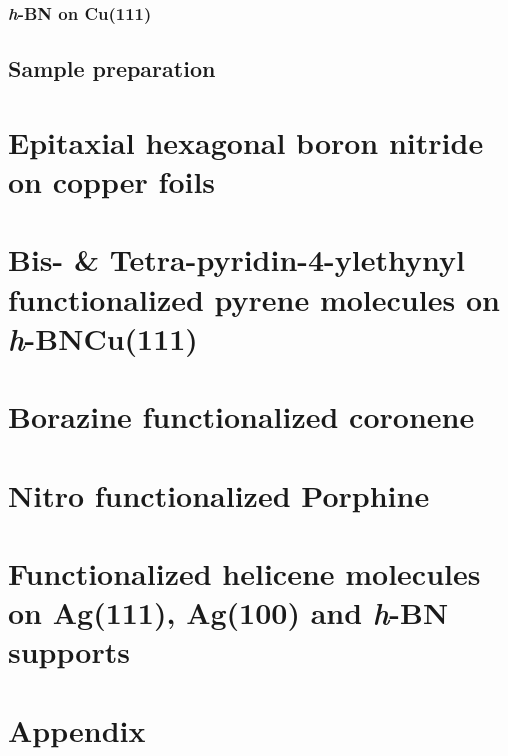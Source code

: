 \documentclass[
twoside,				%
BCOR=8mm,				%
headings=normal,		%
headsepline,			%
footsepline,			%
plainfootsepline,		%
]{scrbook}
\begin{document}
     \subsection{\textit{h}-BN on Cu(111)}
		

  \section{Sample preparation}
    

\chapter{Epitaxial hexagonal boron nitride on copper foils}
%


\chapter{Bis- \& Tetra-pyridin-4-ylethynyl functionalized pyrene molecules on \textit{h}-BN\/Cu(111)}


\chapter{Borazine functionalized coronene}


\chapter{Nitro functionalized Porphine}
    

\chapter{Functionalized helicene molecules on Ag(111), Ag(100) and \textit{h}-BN supports}



\backmatter{}

\chapter{Appendix}
%  
\end{document}
